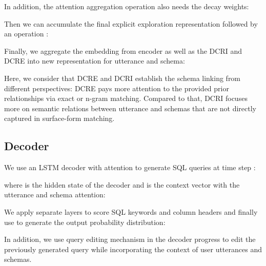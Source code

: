\documentclass[letterpaper]{article} \usepackage{aaai21}  \usepackage{times}  \usepackage{helvet} \usepackage{courier}  \usepackage[hyphens]{url}  \usepackage{graphicx} \urlstyle{rm} \def\UrlFont{\rm}  \usepackage{natbib}  \usepackage{caption} \frenchspacing  \setlength{\pdfpagewidth}{8.5in}  \setlength{\pdfpageheight}{11in}
\begin{document}
In addition, the attention aggregation operation also needs the decay weights:

Then we can accumulate the final explicit exploration representation  followed by an  operation \cite{DBLP:conf/nips/VaswaniSPUJGKP17}:


Finally, we aggregate the embedding from encoder as well as the DCRI and DCRE into new representation for utterance and schema:


Here, we consider that DCRE and DCRI establish the schema linking from different perspectives: DCRE pays more attention to the provided prior relationships via exact or n-gram matching. 
Compared to that, DCRI focuses more on semantic relations between utterance and schemas that are not directly captured in surface-form matching.

\subsection{Decoder}
\label{decoder}
We use an LSTM decoder with attention to generate SQL queries at time step :

where  is the hidden state of the decoder and  is the context vector with the utterance and schema attention:


We apply separate layers to score SQL keywords and column headers and finally use  to generate the output probability distribution:


In addition, we use query editing mechanism \cite{DBLP:conf/emnlp/ZhangYESXLSXSR19} in the decoder progress to edit the previously generated query while incorporating the context of user utterances and schemas. 


\begin{table*}
    \small
	\centering
	\caption{Comparison of the statistics of cross-domain context-dependent Text-to-SQL datasets.}
	\label{statis}
\end{table*}
\end{document}
